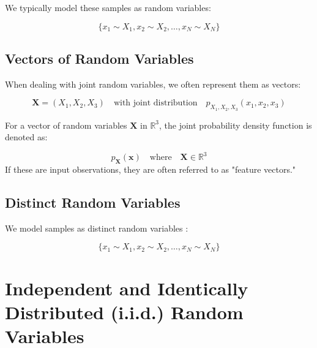 \noindent We typically model these samples as random variables:

\[
\{x_1 \sim X_1, x_2 \sim X_2, \ldots, x_N \sim X_N\}
\]

\subsection{Vectors of Random Variables}

When dealing with joint random variables, we often represent them as vectors:

\[
\mathbf{X} = (X_1, X_2, X_3) \quad \text{with joint distribution} \quad p_{X_1, X_2, X_3}(x_1, x_2, x_3)
\]

\noindent For a vector of random variables \(\mathbf{X}\) in \( \mathbb{R}^3 \), the joint probability density function is denoted as:

\[
p_{\mathbf{X}}(\mathbf{x}) \quad \text{where} \quad \mathbf{X} \in \mathbb{R}^3
\]
\noindent 
If these are input observations, they are often referred to as "feature vectors."

\subsection{Distinct Random Variables}

We model samples as distinct random variables :\bigskip

\[
\{x_1 \sim X_1, x_2 \sim X_2, \ldots, x_N \sim X_N\}
\]


\section{Independent and Identically Distributed (i.i.d.) Random Variables}

